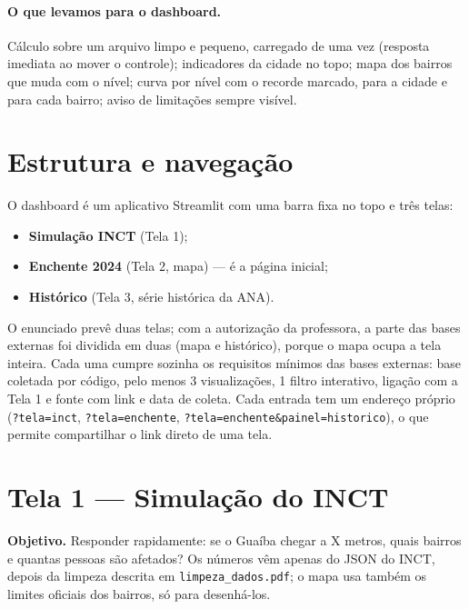 \documentclass[11pt,a4paper]{article}
\begin{document}
\paragraph{O que levamos para o dashboard.} Cálculo sobre um arquivo limpo e pequeno, carregado de uma vez (resposta imediata ao mover o controle); indicadores da cidade no topo; mapa dos bairros que muda com o nível; curva por nível com o recorde marcado, para a cidade e para cada bairro; aviso de limitações sempre visível.

\section{Estrutura e navegação}
O dashboard é um aplicativo Streamlit com uma barra fixa no topo e três telas:
\begin{itemize}
  \item \textbf{Simulação INCT} (Tela 1);
  \item \textbf{Enchente 2024} (Tela 2, mapa) --- é a página inicial;
  \item \textbf{Histórico} (Tela 3, série histórica da ANA).
\end{itemize}
O enunciado prevê duas telas; com a autorização da professora, a parte das bases externas foi dividida em duas (mapa e histórico), porque o mapa ocupa a tela inteira. Cada uma cumpre sozinha os requisitos mínimos das bases externas: base coletada por código, pelo menos 3 visualizações, 1 filtro interativo, ligação com a Tela 1 e fonte com link e data de coleta. Cada entrada tem um endereço próprio (\texttt{?tela=inct}, \texttt{?tela=enchente}, \texttt{?tela=enchente\&painel=historico}), o que permite compartilhar o link direto de uma tela.

\section{Tela 1 --- Simulação do INCT}
\textbf{Objetivo.} Responder rapidamente: se o Guaíba chegar a X metros, quais bairros e quantas pessoas são afetados? Os números vêm apenas do JSON do INCT, depois da limpeza descrita em \texttt{limpeza\_dados.pdf}; o mapa usa também os limites oficiais dos bairros, só para desenhá-los.
\end{document}
